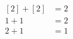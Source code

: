 \documentclass[preview]{standalone}
\begin{document}
\begin{align*}
\begin{aligned}[2] + [2] &= 2 \\1 + 1 &= 2 \\2 + 1 &= 1\end{aligned}
\end{align*}
\end{document}
